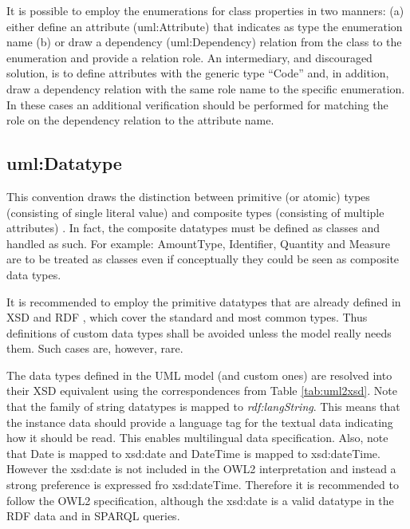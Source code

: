 	It is possible to employ the enumerations for class properties in two manners: (a) either define an attribute (uml:Attribute) that indicates as type the enumeration name (b) or draw a dependency (uml:Dependency) relation from the class to the enumeration and provide a relation role. An intermediary, and discouraged solution, is to define attributes with the generic type ``Code'' and, in addition, draw a dependency relation with the same role name to the specific enumeration. In these cases an additional verification should be performed for matching the role on the dependency relation to the attribute name.
	

	\subsection{uml:Datatype}
	\label{sec:datatype}
	
	This convention draws the distinction between primitive (or atomic) types (consisting of single literal value) and composite types (consisting of multiple attributes) \citep{isaHandbook2015}. In fact, the composite datatypes must be defined as classes and handled as such. For example: AmountType, Identifier, Quantity and Measure are to be treated as classes even if conceptually they could be seen as composite data types.
	
	It is recommended to employ the primitive datatypes that are already defined in XSD \cite{xsd1.1-spec} and RDF \cite{rdf11}, which cover the standard and most common types. Thus definitions of custom data types shall be avoided unless the model really needs them. Such cases are, however, rare.
	
	The data types defined in the UML model (and custom ones) are resolved into their XSD equivalent using the correspondences from Table \ref{tab:uml2xsd}. Note that the family of string datatypes is mapped to \textit{rdf:langString}. This means that the instance data should provide a language tag for the textual data indicating how it should be read. This enables multilingual data specification. Also, note that Date is mapped to xsd:date and DateTime is mapped to xsd:dateTime. However the xsd:date is not included in the OWL2 interpretation and instead a strong preference is expressed fro xsd:dateTime. Therefore it is recommended to follow the OWL2 specification, although the xsd:date is a valid datatype in the RDF data and in SPARQL queries. 
	
